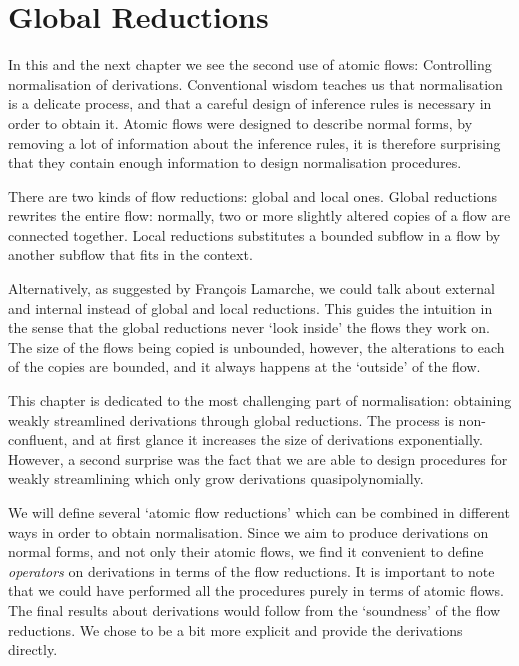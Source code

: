 \chapter{Global Reductions}\label{chapter:GlobalReductions}

In this and the next chapter we see the second use of atomic flows: Controlling normalisation of derivations. Conventional wisdom teaches us that normalisation is a delicate process, and that a careful design of inference rules is necessary in order to obtain it. Atomic flows were designed to describe normal forms, by removing a lot of information about the inference rules, it is therefore surprising that they contain enough information to design normalisation procedures.

There are two kinds of flow reductions: global and local ones. Global reductions rewrites the entire flow: normally, two or more slightly altered copies of a flow are connected together. Local reductions substitutes a bounded subflow in a flow by another subflow that fits in the context.

Alternatively, as suggested by Fran\c{c}ois Lamarche, we could talk about external and internal instead of global and local reductions. This guides the intuition in the sense that the global reductions never `look inside' the flows they work on. The size of the flows being copied is unbounded, however, the alterations to each of the copies are bounded, and it always happens at the `outside' of the flow.

This chapter is dedicated to the most challenging part of normalisation: obtaining weakly streamlined derivations through global reductions. The process is non-confluent, and at first glance it increases the size of derivations exponentially. However, a second surprise was the fact that we are able to design procedures for weakly streamlining which only grow derivations quasipolynomially.

We will define several `atomic flow reductions' which can be combined in different ways in order to obtain normalisation. Since we aim to produce derivations on normal forms, and not only their atomic flows, we find it convenient to define \emph{operators} on derivations in terms of the flow reductions. It is important to note that we could have performed all the procedures purely in terms of atomic flows. The final results about derivations would follow from the `soundness' of the flow reductions. We chose to be a bit more explicit and provide the derivations directly.

